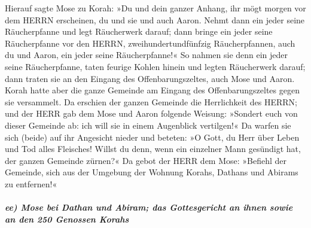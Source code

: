 Hierauf sagte Mose zu Korah: »Du und dein ganzer Anhang,
ihr mögt morgen vor dem HERRN erscheinen, du und sie und auch Aaron.
Nehmt dann ein jeder seine Räucherpfanne und legt
Räucherwerk darauf; dann bringe ein jeder seine Räucherpfanne vor den
HERRN, zweihundertundfünfzig Räucherpfannen, auch du und Aaron, ein
jeder seine Räucherpfanne!« So nahmen sie denn ein jeder
seine Räucherpfanne, taten feurige Kohlen hinein und legten Räucherwerk
darauf; dann traten sie an den Eingang des Offenbarungszeltes, auch Mose
und Aaron. Korah hatte aber die ganze Gemeinde am Eingang
des Offenbarungszeltes gegen sie versammelt. Da erschien der ganzen
Gemeinde die Herrlichkeit des HERRN; und der HERR gab dem
Mose und Aaron folgende Weisung: »Sondert euch von dieser
Gemeinde ab: ich will sie in einem Augenblick vertilgen!«
Da warfen sie sich (beide) auf ihr Angesicht nieder und
beteten: »O Gott, du Herr über Leben und Tod alles Fleisches! Willst du
denn, wenn ein einzelner Mann gesündigt hat, der ganzen Gemeinde
zürnen?« Da gebot der HERR dem Mose:
»Befiehl der Gemeinde, sich aus der Umgebung der Wohnung
Korahs, Dathans und Abirams zu entfernen!«

\hypertarget{ee-mose-bei-dathan-und-abiram-das-gottesgericht-an-ihnen-sowie-an-den-250-genossen-korahs}{%
\subparagraph{ee) Mose bei Dathan und Abiram; das Gottesgericht an ihnen
sowie an den 250 Genossen
Korahs}\label{ee-mose-bei-dathan-und-abiram-das-gottesgericht-an-ihnen-sowie-an-den-250-genossen-korahs}}

